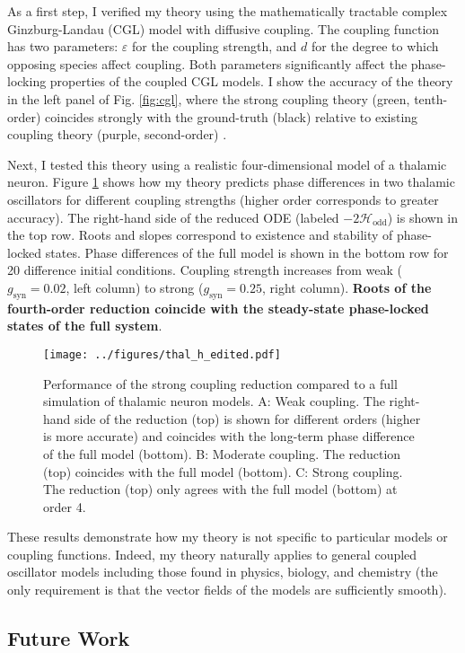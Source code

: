 \documentclass[a4paper,11pt]{article}
\newcommand{\ve}{\varepsilon}
\newcommand{\h}{\mathcal{H}}
\begin{document}
As a first step, I verified my theory using the mathematically tractable complex Ginzburg-Landau (CGL) model with diffusive coupling. The coupling function has two parameters: $\ve$ for the coupling strength, and $d$ for the degree to which opposing species affect coupling. Both parameters significantly affect the phase-locking properties of the coupled CGL models. I show the accuracy of the theory in the left panel of Fig. \ref{fig:cgl}, where the strong coupling theory (green, tenth-order) coincides strongly with the ground-truth (black) relative to existing coupling theory (purple, second-order) \cite{wilson2019phase}. 

Next, I tested this theory using a realistic four-dimensional model of a thalamic neuron. Figure \ref{fig:thal} shows how my theory predicts phase differences in two thalamic oscillators for different coupling strengths (higher order corresponds to greater accuracy). The right-hand side of the reduced ODE (labeled $-2\h_{\text{odd}}$) is shown in the top row. Roots and slopes correspond to existence and stability of phase-locked states. Phase differences of the full model is shown in the bottom row for 20 difference initial conditions. Coupling strength increases from weak ($g_\text{syn}=0.02$, left column) to strong ($g_\text{syn}=0.25$, right column). \textbf{Roots of the fourth-order reduction coincide with the steady-state phase-locked states of the full system}.

\begin{figure}[ht!]
	\centering
	\texttt{[image: ../figures/thal\_h\_edited.pdf]}
	\caption{Performance of the strong coupling reduction compared to a full simulation of thalamic neuron models. A: Weak coupling. The right-hand side of the reduction (top) is shown for different orders (higher is more accurate) and coincides with the long-term phase difference of the full model (bottom). B: Moderate coupling. The reduction (top) coincides with the full model (bottom). C: Strong coupling. The reduction (top) only agrees with the full model (bottom) at order 4. }\label{fig:thal}
\end{figure}

These results demonstrate how my theory is not specific to particular models or coupling functions. Indeed, my theory naturally applies to general coupled oscillator models including those found in physics, biology, and chemistry (the only requirement is that the vector fields of the models are sufficiently smooth).

\subsection{Future Work}
\end{document}
